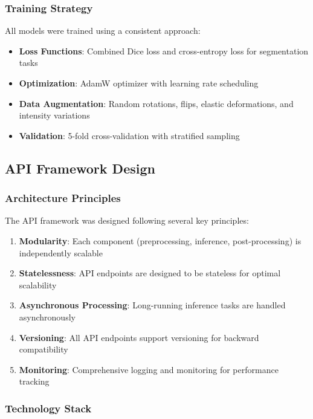 \documentclass[12pt,a4paper]{article}
\begin{document}
\subsubsection{Training Strategy}

All models were trained using a consistent approach:

\begin{itemize}
    \item \textbf{Loss Functions}: Combined Dice loss and cross-entropy loss for segmentation tasks
    \item \textbf{Optimization}: AdamW optimizer with learning rate scheduling
    \item \textbf{Data Augmentation}: Random rotations, flips, elastic deformations, and intensity variations
    \item \textbf{Validation}: 5-fold cross-validation with stratified sampling
\end{itemize}

\subsection{API Framework Design}

\subsubsection{Architecture Principles}

The API framework was designed following several key principles:

\begin{enumerate}
    \item \textbf{Modularity}: Each component (preprocessing, inference, post-processing) is independently scalable
    \item \textbf{Statelessness}: API endpoints are designed to be stateless for optimal scalability
    \item \textbf{Asynchronous Processing}: Long-running inference tasks are handled asynchronously
    \item \textbf{Versioning}: All API endpoints support versioning for backward compatibility
    \item \textbf{Monitoring}: Comprehensive logging and monitoring for performance tracking
\end{enumerate}

\subsubsection{Technology Stack}
\end{document}
